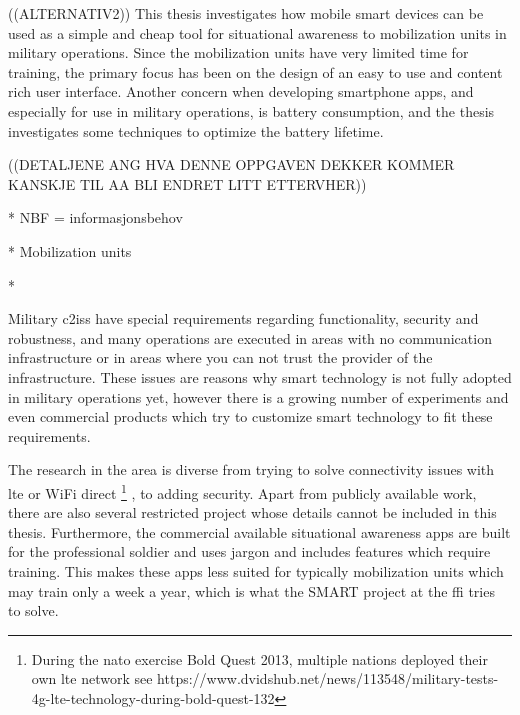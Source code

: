 ((ALTERNATIV2))
This thesis investigates how mobile smart devices can be used as a simple and cheap tool for situational awareness to mobilization units in military operations. Since the mobilization units have very limited time for training, the primary focus has been on the design of an easy to use and content rich user interface. Another concern when developing smartphone apps, and especially for use in military operations, is battery consumption, and the thesis investigates some techniques to optimize the battery lifetime. 

((DETALJENE ANG HVA DENNE OPPGAVEN DEKKER KOMMER KANSKJE TIL AA BLI ENDRET LITT ETTERVHER))


* NBF = informasjonsbehov

* Mobilization units

* 


Military \gls{c2is}s have special requirements regarding functionality, security and robustness, and many operations are executed in areas with no communication infrastructure or in areas where you can not trust the provider of the infrastructure. These issues are reasons why smart technology is not fully adopted in military operations yet, however there is a growing number of experiments and even commercial products\cite{dina} which try to customize smart technology to fit these requirements. 

The research in the area is diverse from trying to solve connectivity issues with \gls{lte} or WiFi direct \footnote{During the \gls{nato} exercise Bold Quest 2013, multiple nations deployed their own \gls{lte} network see https://www.dvidshub.net/news/113548/military-tests-4g-lte-technology-during-bold-quest-132} \cite{04-Do_et_al-Ad_hoc_nw_HybCAST}\cite{04-Kaul_et_al-adaption_of_smart_network}, to adding security. Apart from publicly available work, there are also several restricted project whose details cannot be included in this thesis. Furthermore, the commercial available situational awareness apps are built for the professional soldier and uses jargon and includes features which require training\cite{ep1667_bakgrunn}. This makes these apps less suited for typically mobilization units which may train only a week a year, which is what the SMART project at the \gls{ffi} tries to solve. 


